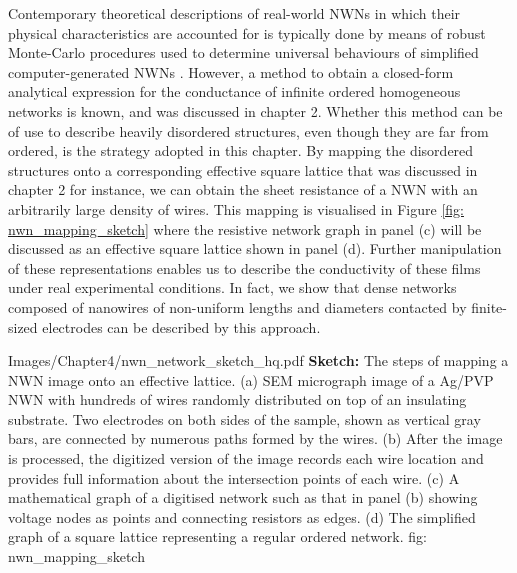 Contemporary theoretical descriptions of real-world NWNs in which their physical characteristics are accounted for is typically done by means of robust Monte-Carlo procedures used to determine universal behaviours of simplified computer-generated NWNs \cite{pike1974,li2009,zezelj2012,ashkan2007,khanarian2013,ainsworth2018}. However, a method to obtain a closed-form analytical expression for the conductance of infinite ordered homogeneous networks is known\cite{cserti2000}, and was discussed in chapter 2. Whether this method can be of use to describe heavily disordered structures, even though they are far from ordered, is the strategy adopted in this chapter. By mapping the disordered structures onto a corresponding effective square lattice that was discussed in chapter 2 for instance, we can obtain the sheet resistance of a NWN with an arbitrarily large density of wires. This mapping is visualised in Figure \ref{fig: nwn_mapping_sketch} where the resistive network graph in panel (c) will be discussed as an effective square lattice shown in panel (d). Further manipulation of these representations enables us to describe the conductivity of these films under real experimental conditions. In fact, we show that dense networks composed of nanowires of non-uniform lengths and diameters contacted by finite-sized electrodes can be described by this approach\cite{ocallaco2016}.

{Images/Chapter4/nwn_network_sketch_hq.pdf}
{\textbf{Sketch:} The steps of mapping a NWN image onto an effective lattice.}
{(a) SEM micrograph image of a Ag/PVP NWN with hundreds of wires randomly distributed on top of an insulating substrate. Two electrodes on both sides of the sample, shown as vertical gray bars, are connected by numerous paths formed by the wires. (b) After the image is processed, the digitized version of the image records each wire location and provides full information about the intersection points of each wire\cite{rocha2015}. (c) A mathematical graph of a digitised network such as that in panel (b) showing voltage nodes as points and connecting resistors as edges. (d) The simplified graph of a square lattice representing a regular ordered network\cite{ocallaco2016}. }
{fig: nwn_mapping_sketch}

